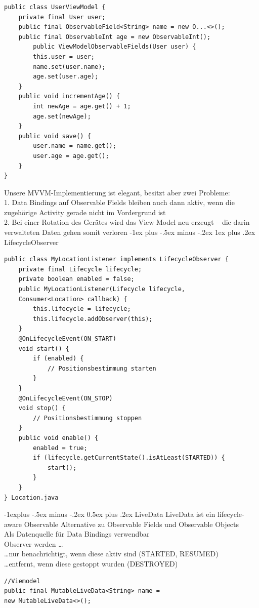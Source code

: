\documentclass[10pt,landscape,a4paper]{article}
\makeatletter
\renewcommand{\subsection}{\@startsection{subsection}{2}{0mm}%
                                {-1explus -.5ex minus -.2ex}%
                                {0.5ex plus .2ex}%
                                {\normalfont\small\bfseries}}
\renewcommand{\subsubsection}{\@startsection{subsubsection}{3}{0mm}%
                                {-1ex plus -.5ex minus -.2ex}%
                                {1ex plus .2ex}%
                                {\normalfont\footnotesize\bfseries}}
\makeatother
\begin{document}
\begin{multicols*}{3}
\begin{verbatim}
public class UserViewModel {
    private final User user;
    public final ObservableField<String> name = new O...<>();
    public final ObservableInt age = new ObservableInt();
        public ViewModelObservableFields(User user) {
        this.user = user;
        name.set(user.name);
        age.set(user.age);
    }
    public void incrementAge() {
        int newAge = age.get() + 1;
        age.set(newAge);
    }
    public void save() {
        user.name = name.get();
        user.age = age.get();
    }
}
\end{verbatim}

Unsere MVVM-Implementierung ist elegant, besitzt aber zwei Probleme:\\
1. Data Bindings auf Observable Fields bleiben
auch dann aktiv, wenn die zugehörige Activity
gerade nicht im Vordergrund ist\\
2. Bei einer Rotation des Gerätes wird das View
Model neu erzeugt – die darin verwalteten
Daten gehen somit verloren
\subsubsection{LifecycleObserver}
\begin{verbatim}
public class MyLocationListener implements LifecycleObserver {
    private final Lifecycle lifecycle;
    private boolean enabled = false;
    public MyLocationListener(Lifecycle lifecycle,
    Consumer<Location> callback) {
        this.lifecycle = lifecycle;
        this.lifecycle.addObserver(this);
    }
    @OnLifecycleEvent(ON_START)
    void start() {
        if (enabled) {
            // Positionsbestimmung starten
        }
    }
    @OnLifecycleEvent(ON_STOP)
    void stop() {
        // Positionsbestimmung stoppen
    }
    public void enable() {
        enabled = true;
        if (lifecycle.getCurrentState().isAtLeast(STARTED)) {
            start();
        }
    }
} Location.java
\end{verbatim}

\subsection{LiveData}
LiveData ist ein lifecycle-aware Observable
Alternative zu Observable Fields und
Observable Objects\\
Als Datenquelle für Data Bindings verwendbar\\

Observer werden \dots \\
\dots nur benachrichtigt, wenn diese aktiv sind (STARTED, RESUMED) \\
\dots entfernt, wenn diese gestoppt wurden
(DESTROYED)
\begin{verbatim}
//Viemodel
public final MutableLiveData<String> name =
new MutableLiveData<>();


\end{verbatim}
\end{multicols*}
\end{document}
